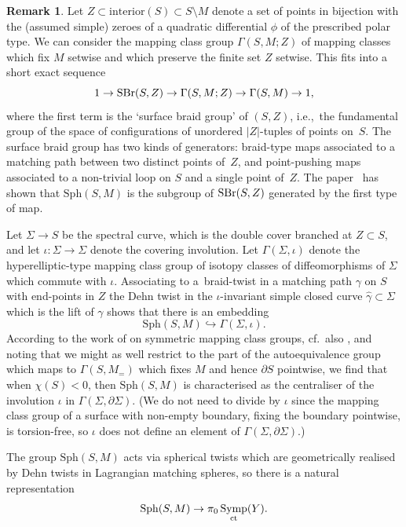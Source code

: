 \documentclass[pdftex]{sigma}
\DeclareMathOperator{\Symp}{Symp}
\theoremstyle{definition}
\newtheorem{rmk}[thm]{Remark}
\numberwithin{equation}{section}
\begin{document}
\begin{rmk}
Let $Z \subset \mathrm{interior}(S) \subset S\setminus M$ denote a set of points in bijection with the (assumed simple) zeroes of a quadratic differential $\phi$ of the prescribed polar type. We can consider the mapping class group $\Gamma(S,M;Z)$ of mapping classes which fix $M$ setwise and which preserve the finite set $Z$ setwise. This fits into a short exact sequence
\[
1 \to {\rm SBr}(S,Z) \to \Gamma(S,M;Z) \to \Gamma(S,M) \to 1,
\]
where the first term is the `surface braid group' of $(S,Z)$, i.e.,~the fundamental group of the space of configurations of unordered $|Z|$-tuples of points on~$S$. The surface braid group has two kinds of generators: braid-type maps associated to a matching path between two distinct points of~$Z$, and point-pushing maps associated to a non-trivial loop on $S$ and a single point of~$Z$. The paper~\cite{QiuYu:spherical-twist-group} has shown that $\mathrm{Sph}(S,M)$ is the subgroup of ${\rm SBr}(S,Z)$ generated by the first type of map.

Let $\Sigma \to S$ be the spectral curve, which is the double cover branched at $Z \subset S$, and let $\iota\colon \Sigma \to \Sigma$ denote the covering involution. Let $\Gamma(\Sigma,\iota)$ denote the hyperelliptic-type mapping class group of isotopy classes of diffeomorphisms of $\Sigma$ which commute with $\iota$. Associating to a~braid-twist in a matching path $\gamma$ on $S$ with end-points in $Z$ the Dehn twist in the $\iota$-invariant simple closed curve $\hat\gamma \subset \Sigma$ which is the lift of $\gamma$ shows that there is an embedding
\[
\mathrm{Sph}(S,M) \hookrightarrow \Gamma(\Sigma,\iota).
\]
According to the work of \cite{Birman-Hilden} on symmetric mapping class groups, cf.~also \cite{Margalit-Winarski}, and noting that we might as well restrict to the part of the autoequivalence group which maps to $\Gamma(S,M_{=})$ which fixes $M$ and hence $\partial S$ pointwise, we find that when $\chi(S)<0$, then $\mathrm{Sph}(S,M)$ is characterised as the centraliser of the involution $\iota$ in $\Gamma(\Sigma,\partial\Sigma)$. (We do not need to divide by $\iota$ since the mapping class group of a surface with non-empty boundary, fixing the boundary pointwise, is torsion-free, so $\iota$ does not define an element of $\Gamma(\Sigma,\partial\Sigma)$.)
\end{rmk}


The group $\mathrm{Sph}(S,M)$ acts via spherical twists which are geometrically realised by Dehn twists in Lagrangian matching spheres, so there is a natural representation
\[
\mathrm{Sph}(S,M) \to \pi_0\Symp_{\rm ct}(Y). \]
\end{document}
